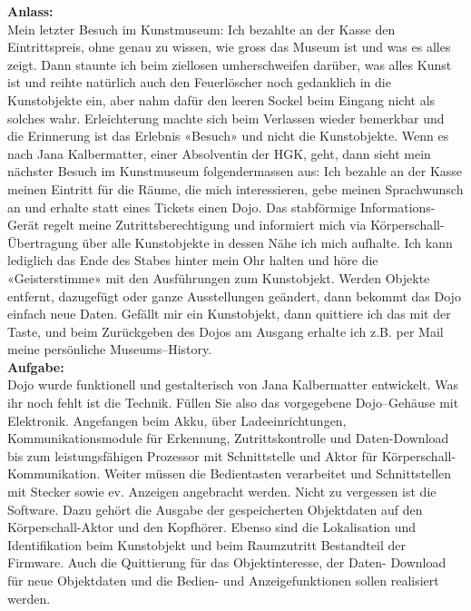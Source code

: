 \documentclass[10pt,a4paper,oneside]{99_fhnwreport}
\begin{document}
\textbf{Anlass:}\\
Mein letzter Besuch im Kunstmuseum: Ich bezahlte an der Kasse den
Eintrittspreis, ohne genau zu wissen, wie gross das Museum ist und was es alles zeigt. Dann
staunte ich beim ziellosen umherschweifen darüber, was alles Kunst ist und reihte natürlich
auch den Feuerlöscher noch gedanklich in die Kunstobjekte ein, aber nahm dafür den leeren
Sockel beim Eingang nicht als solches wahr. Erleichterung machte sich beim Verlassen wieder
bemerkbar und die Erinnerung ist das Erlebnis «Besuch» und nicht die Kunstobjekte.
Wenn es nach Jana Kalbermatter, einer Absolventin der HGK, geht, dann sieht mein nächster
Besuch im Kunstmuseum folgendermassen aus: Ich bezahle an der Kasse meinen Eintritt für
die Räume, die mich interessieren, gebe meinen Sprachwunsch an und erhalte statt eines
Tickets einen Dojo. Das stabförmige Informations-Gerät regelt meine Zutrittsberechtigung und
informiert mich via Körperschall-Übertragung über alle Kunstobjekte in dessen Nähe ich mich
aufhalte. Ich kann lediglich das Ende des Stabes hinter mein Ohr halten und höre die
«Geisterstimme» mit den Ausführungen zum Kunstobjekt. Werden Objekte entfernt, dazugefügt
oder ganze Ausstellungen geändert, dann bekommt das Dojo einfach neue Daten. Gefällt mir
ein Kunstobjekt, dann quittiere ich das mit der Taste, und beim Zurückgeben des Dojos am
Ausgang erhalte ich z.B. per Mail meine persönliche Museums–History.\\
\textbf{Aufgabe:}\\
Dojo wurde funktionell und gestalterisch von Jana Kalbermatter entwickelt. Was
ihr noch fehlt ist die Technik. Füllen Sie also das vorgegebene Dojo–Gehäuse mit Elektronik.
Angefangen beim Akku, über Ladeeinrichtungen, Kommunikationsmodule für Erkennung,
Zutrittskontrolle und Daten-Download bis zum leistungsfähigen Prozessor mit Schnittstelle und
Aktor für Körperschall-Kommunikation. Weiter müssen die Bedientasten verarbeitet und
Schnittstellen mit Stecker sowie ev. Anzeigen angebracht werden. Nicht zu vergessen ist die
Software. Dazu gehört die Ausgabe der gespeicherten Objektdaten auf den Körperschall-Aktor
und den Kopfhörer. Ebenso sind die Lokalisation und Identifikation beim Kunstobjekt und beim
Raumzutritt Bestandteil der Firmware. Auch die Quittierung für das Objektinteresse, der Daten-
Download für neue Objektdaten und die Bedien- und Anzeigefunktionen sollen realisiert
werden.\cite{PFLVOR}

\end{document}
